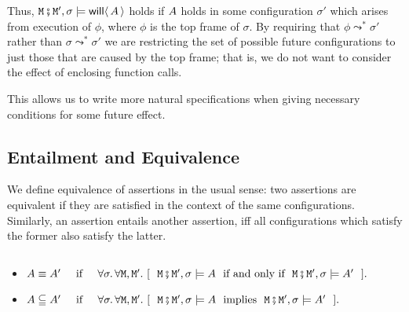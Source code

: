 Thus,  ${\mbox{\tt{\ensuremath{{\mbox{\tt{M}}}}}}}\fatsemi {\mbox{\tt{\ensuremath{{\mbox{\tt{M}}}}}}}', \sigma \models  {\mathsf{will}}\langle \,A\,\rangle $ holds if
$A$ holds in some configuration $\sigma'$ which arises from execution of $\phi$, where $\phi$ is the top frame of $\sigma$. By requiring that $\phi \leadsto^* \sigma' $ rather than
$\sigma \leadsto^* \sigma' $ we are restricting the set of possible future configurations to
just those that are caused by the top frame;
that is, we do not want to consider the effect of  enclosing function calls.

This allows us to write more natural specifications
when giving necessary conditions for some future effect.
 

\subsection{Entailment and Equivalence}
 
We define equivalence of   assertions in the usual sense: two assertions are equivalent if they are satisfied  in
the context of the same configurations.
Similarly, an assertion entails another assertion, iff all configurations 
which satisfy the former also satisfy the latter.  

\begin{definition}
$ ~ $

\begin{itemize}
\item
$\A \equiv \A'\  \IFF\    \forall \sigma.\, \forall \M, \M'. \ [\ \ \M\mkpair \M', \sigma \models \A\ \mbox{ if and only if }\ \M\mkpair \M', \sigma \models \A'\ \ ].$
\item
$\A \subseteqq \A'\  \IFF\    \forall \sigma.\, \forall \M, \M'. \ [\ \ \M\mkpair \M', \sigma \models \A\ \mbox{ implies }\ \M\mkpair \M', \sigma \models \A'\ \ ].$
\end{itemize}
\end{definition}



